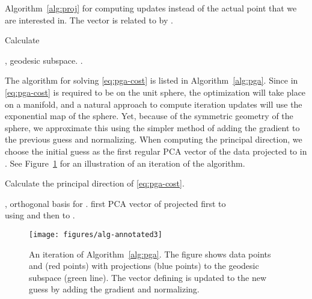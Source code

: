 \documentclass[final]{svjour3}
\begin{document}
Algorithm~\ref{alg:proj} for computing  updates 
instead of the actual point  that we are interested in. The vector  is
related to  by .
\begin{algorithm}
\caption{Calculate }
\label{alg:proj}
\begin{algorithmic}
    \REQUIRE ,  geodesic subspace.
    \STATE 
  \REPEAT 
  \STATE 
  \STATE  
  \STATE  
  \STATE  
  .
\end{algorithmic}
\end{algorithm}

The algorithm for solving \eqref{eq:pga-cost}
is listed in Algorithm~\ref{alg:pga}. 
Since  in \eqref{eq:pga-cost} is required to be on the unit sphere, 
the optimization will take place on a manifold,
and a natural approach to compute iteration updates will use the exponential
map of the sphere. Yet, because of the symmetric geometry of the sphere, we 
approximate this using the simpler method
of adding the gradient to the previous guess and normalizing.
When computing the  principal direction, we 
choose the initial guess as the first regular PCA vector of the data projected
to  in . See Figure~\ref{fig:alg} for
an illustration of an iteration of the algorithm.
\begin{algorithm}
    \caption{Calculate the  principal direction of \eqref{eq:pga-cost}.}
\label{alg:pga}
\begin{algorithmic}
    \REQUIRE ,  orthogonal basis for
    .
  \STATE  first PCA vector of  projected first to
  \\\hspace{2.1em}using  and then to 
  \REPEAT 
  \STATE 
    \STATE  
  \STATE  
  \STATE  
  \STATE  
  .
\end{algorithmic}
\end{algorithm}
\begin{figure}[h]
    \begin{center}
      \texttt{[image: figures/alg-annotated3]}
    \end{center}
    \caption{An iteration of Algorithm~\ref{alg:pga}. The figure shows data points  and
     (red points) with projections (blue points) to the geodesic subspace  (green
    line). The vector  defining  is updated to the new guess by adding the
  gradient  and normalizing.}
    \label{fig:alg}
\end{figure}
\end{document}
